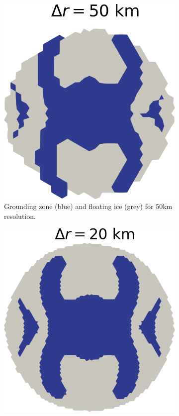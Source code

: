 \documentclass{article}
\begin{document}
\begin{figure}[!h]
	\centering %
	\begin{subfigure}{0.25\textwidth}
		\includegraphics[width=\linewidth]{../fig/Grounded_zone_50km.png}
		\caption{Grounding zone (blue) and floating ice (grey) for 50km resolution.}
		\label{fig:1}
	\end{subfigure}\hfil %
	\begin{subfigure}{0.25\textwidth}
		\includegraphics[width=\linewidth]{../fig/Grounded_zone_20km.png}

\end{subfigure}
\end{figure}
\end{document}
